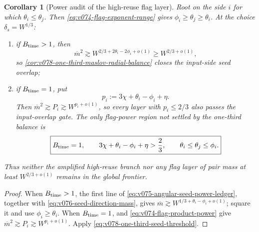 \documentclass[10pt]{article}
\newtheorem{corollary}[theorem]{Corollary}
\begin{document}
\begin{corollary}[Power audit of the high-reuse flag layer]
\label{cor:v078-high-reuse-seed-power-audit}
Root on the side \(i\) for which \(\theta_i\le\theta_j\).  Then
\eqref{eq:v074-flag-exponent-range} gives \(\phi_i\ge\theta_j\ge\theta_i\).  At the choice
\(\delta_s=W^{1/3}\):
\begin{enumerate}[label=\textnormal{(\roman*)}]
\item if \(B_{\rm time}>1\), then
\begin{equation}
\label{eq:v078-amplified-seed-closes}
\overline m^2
\gtrsim
W^{2/3+2\theta_i-2\phi_i+o(1)}
\ge
W^{2/3+o(1)},
\end{equation}
so \cref{cor:v078-one-third-maslov-radial-balance} closes the input-side seed overlap;
\item if \(B_{\rm time}=1\), put
\begin{equation}
\label{eq:v078-unamplified-pair-exponent}
p_i:=3\chi+\theta_i-\phi_i+\eta.
\end{equation}
Then \(\overline m^2\gtrsim P_i\gtrsim W^{p_i+o(1)}\), so every layer with
\(p_i\le2/3\) also passes the input-overlap gate.  The only flag-power region not settled by the one-third balance is
\begin{equation}
\label{eq:v078-final-unamplified-wedge}
\boxed{
B_{\rm time}=1,
\qquad
3\chi+\theta_i-\phi_i+\eta>\frac23,
\qquad
\theta_i\le\theta_j\le\phi_i.
}
\end{equation}
\end{enumerate}
Thus neither the amplified high-reuse branch nor any flag layer of pair mass at least
\(W^{2/3+o(1)}\) remains in the global frontier.
\end{corollary}

\begin{proof}
When \(B_{\rm time}>1\), the first line of
\eqref{eq:v075-angular-seed-power-ledger}, together with
\eqref{eq:v076-seed-direction-mass}, gives
\(\overline m\gtrsim W^{1/3+\theta_i-\phi_i+o(1)}\); square it and use
\(\phi_i\ge\theta_i\).  When \(B_{\rm time}=1\),  and
\eqref{eq:v074-flag-product-power} give
\(\overline m^2\gtrsim P_i\gtrsim W^{p_i+o(1)}\).  Apply
\eqref{eq:v078-one-third-seed-threshold}.
\end{proof}
\end{document}
